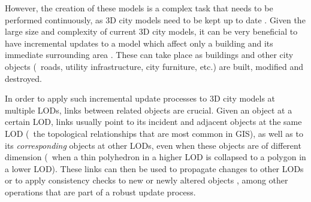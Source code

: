 However, the creation of these models is a complex task that needs to be performed continuously, as 3D city models need to be kept up to date \citep{Zlatanova04,Kolbe05}.
Given the large size and complexity of current 3D city models, it can be very beneficial to have incremental updates to a model which affect only a building and its immediate surrounding area \citep{Dollner06}.
These can take place as buildings and other city objects (\eg\ roads, utility infrastructure, city furniture, etc.) are built, modified and destroyed.

In order to apply such incremental update processes to 3D city models at multiple LODs, links between related objects are crucial.
Given an object at a certain LOD, links usually point to its incident and adjacent objects at the same LOD (\ie\ the topological relationships that are most common in GIS), as well as to its \emph{corresponding} objects at other LODs, even when these objects are of different dimension (\eg\ when a thin polyhedron in a higher LOD is collapsed to a polygon in a lower LOD).
These links can then be used to propagate changes to other LODs \citep{vanOosterom10} or to apply consistency checks to new or newly altered objects \citep{Groger11a}, among other operations that are part of a robust update process.

